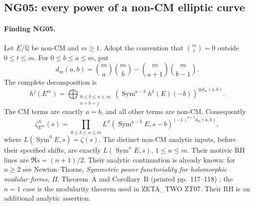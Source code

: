 \documentclass[11pt]{article}
\theoremstyle{remark}
\begin{document}
\subsection{NG05: every power of a non-CM elliptic curve}
\label{NG05}

\paragraph{Finding NG05.}
Let $E/\mathbb Q$ be non-CM and $m\ge1$.  Adopt the convention that
$\binom m t=0$ outside $0\le t\le m$.  For $0\le b\le a\le m$, put
\[
 d_m(a,b)=\binom ma\binom mb-
                        \binom m{a+1}\binom m{b-1}.           \tag{NG05.1}
\]
The complete decomposition is
\[
 h^j(E^m)=\bigoplus_{\substack{0\le b\le a\le m\\a+b=j}}
       \left(\operatorname{Sym}^{a-b}h^1(E)(-b)\right)^{\oplus d_m(a,b)}.
                                                                    \tag{NG05.2}
\]
The CM terms are exactly $a=b$, and all other terms are non-CM.
Consequently
\[
 \zeta_{E^m}^S(s)=
 \prod_{0\le b\le a\le m}
 L^S(\operatorname{Sym}^{a-b}E,s-b)^{(-1)^{a+b}d_m(a,b)},       \tag{NG05.3}
\]
where $L(\operatorname{Sym}^0E,s)=\zeta(s)$.  The distinct non-CM
analytic inputs, before their specified shifts, are exactly
$L(\operatorname{Sym}^nE,s)$, $1\le n\le m$.  Their motivic RH lines
are $\Re s=(n+1)/2$.  Their analytic continuation is already known:
for $n\ge2$ see Newton--Thorne, \emph{Symmetric power functoriality
for holomorphic modular forms, II}, Theorem~A and Corollary~B
(printed pp.~117--118) \cite{NGNewtonThorne}; the $n=1$ case is the modularity theorem
used in ZETA\_TWO ZT07.  Their RH is an additional analytic assertion.
\end{document}
